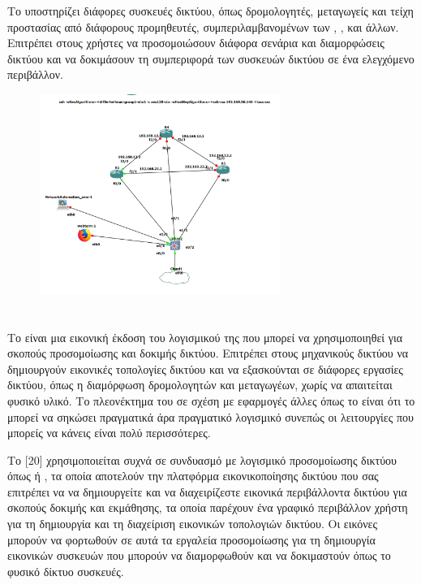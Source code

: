 Το  υποστηρίζει διάφορες συσκευές δικτύου, όπως δρομολογητές, μεταγωγείς και τείχη προστασίας 
από διάφορους προμηθευτές, συμπεριλαμβανομένων των , ,  και άλλων. Επιτρέπει στους χρήστες να 
προσομοιώσουν διάφορα σενάρια και διαμορφώσεις δικτύου και να δοκιμάσουν τη συμπεριφορά των 
συσκευών δικτύου σε ένα ελεγχόμενο περιβάλλον. 

\begin{figure}[htb]
	\centering
	\includegraphics[width=0.7\textwidth]{graphics/Network_topology.png}
	\caption{ }
\end{figure}



\section{}

Το  είναι μια εικονική έκδοση του λογισμικού  της  που 
μπορεί να χρησιμοποιηθεί για σκοπούς προσομοίωσης και δοκιμής δικτύου. Επιτρέπει στους μηχανικούς δικτύου να δημιουργούν εικονικές τοπολογίες δικτύου και να εξασκούνται σε διάφορες εργασίες δικτύου, 
όπως η διαμόρφωση δρομολογητών και μεταγωγέων, χωρίς να απαιτείται φυσικό υλικό. Το πλεονέκτημα του  σε σχέση με εφαρμογές άλλες όπως το  είναι ότι το  
μπορεί να σηκώσει πραγματικά  άρα πραγματικό λογισμικό συνεπώς οι λειτουργίες που μπορείς να κάνεις είναι πολύ περισσότερες.

Το [20] χρησιμοποιείται συχνά σε συνδυασμό με λογισμικό προσομοίωσης δικτύου όπως 
 ή , τα οποία αποτελούν την πλατφόρμα εικονικοποίησης δικτύου που σας επιτρέπει να 
να δημιουργείτε και να διαχειρίζεστε εικονικά περιβάλλοντα δικτύου για σκοπούς δοκιμής και εκμάθησης, τα οποία παρέχουν ένα γραφικό περιβάλλον χρήστη για τη δημιουργία και τη διαχείριση εικονικών 
τοπολογιών δικτύου. Οι εικόνες  μπορούν να φορτωθούν σε αυτά τα εργαλεία προσομοίωσης για τη δημιουργία εικονικών συσκευών  που μπορούν να διαμορφωθούν και να δοκιμαστούν όπως το φυσικό δίκτυο 
συσκευές.

